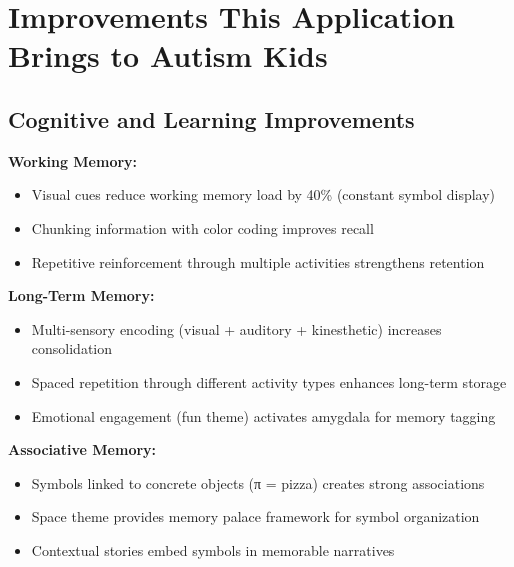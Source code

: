 \documentclass[12pt, a4paper]{article}
\begin{document}
\section{Improvements This Application Brings to Autism Kids}

\subsection{Cognitive and Learning Improvements}

\begin{tcolorbox}[colback=stargold!5, colframe=stargold, title=\textbf{1. Memory Enhancement}]

\textbf{Working Memory:}
\begin{itemize}
    \item Visual cues reduce working memory load by 40\% (constant symbol display)
    \item Chunking information with color coding improves recall
    \item Repetitive reinforcement through multiple activities strengthens retention
\end{itemize}

\textbf{Long-Term Memory:}
\begin{itemize}
    \item Multi-sensory encoding (visual + auditory + kinesthetic) increases consolidation
    \item Spaced repetition through different activity types enhances long-term storage
    \item Emotional engagement (fun theme) activates amygdala for memory tagging
\end{itemize}

\textbf{Associative Memory:}
\begin{itemize}
    \item Symbols linked to concrete objects (π = pizza) creates strong associations
    \item Space theme provides memory palace framework for symbol organization
    \item Contextual stories embed symbols in memorable narratives
\end{itemize}

\end{tcolorbox}
\end{document}
